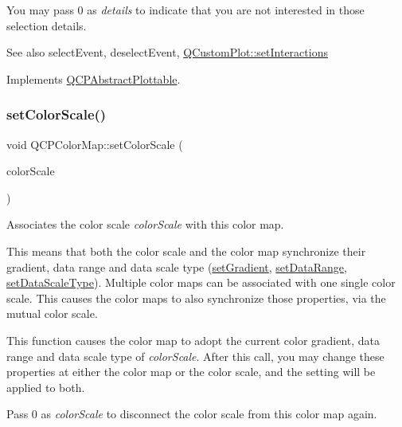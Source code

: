You may pass 0 as {\itshape details} to indicate that you are not interested in those selection details.

\begin{DoxySeeAlso}{See also}
select\+Event, deselect\+Event, \hyperlink{class_q_custom_plot_a5ee1e2f6ae27419deca53e75907c27e5}{Q\+Custom\+Plot\+::set\+Interactions} 
\end{DoxySeeAlso}


Implements \hyperlink{class_q_c_p_abstract_plottable_a38efe9641d972992a3d44204bc80ec1d}{Q\+C\+P\+Abstract\+Plottable}.

\hypertarget{class_q_c_p_color_map_aa828921db364fe3c6af4619580ab85fd}{}\label{class_q_c_p_color_map_aa828921db364fe3c6af4619580ab85fd} 
\subsubsection{\texorpdfstring{set\+Color\+Scale()}{setColorScale()}}
{\footnotesize\ttfamily void Q\+C\+P\+Color\+Map\+::set\+Color\+Scale (\begin{DoxyParamCaption}\item[{\hyperlink{class_q_c_p_color_scale}{Q\+C\+P\+Color\+Scale} $\ast$}]{color\+Scale }\end{DoxyParamCaption})}

Associates the color scale {\itshape color\+Scale} with this color map.

This means that both the color scale and the color map synchronize their gradient, data range and data scale type (\hyperlink{class_q_c_p_color_map_a7313c78360471cead3576341a2c50377}{set\+Gradient}, \hyperlink{class_q_c_p_color_map_a980b42837821159786a85b4b7dcb8774}{set\+Data\+Range}, \hyperlink{class_q_c_p_color_map_a9d20aa08e3c1f20f22908c45b9c06511}{set\+Data\+Scale\+Type}). Multiple color maps can be associated with one single color scale. This causes the color maps to also synchronize those properties, via the mutual color scale.

This function causes the color map to adopt the current color gradient, data range and data scale type of {\itshape color\+Scale}. After this call, you may change these properties at either the color map or the color scale, and the setting will be applied to both.

Pass 0 as {\itshape color\+Scale} to disconnect the color scale from this color map again. \hypertarget{class_q_c_p_color_map_a5a23e133a20c4ccad35fd32e6c0f9809}{}\label{class_q_c_p_color_map_a5a23e133a20c4ccad35fd32e6c0f9809} 
